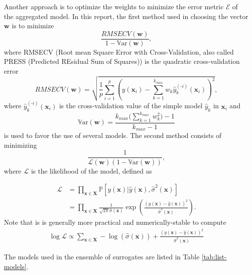\documentclass[12pt]{article}
\def\P{{\mathbb{P}}}
\def\L{{\mathcal{L}}}
\newcommand{\x}{\mathbf{x}}
\newcommand{\w}{\mathbf{w}}
\newcommand{\sh}{\hat{\sigma}}
\newcommand{\yh}{\hat{y}}
\newcommand{\kmax}{{k_{max}}}
\newcommand{\X}{\mathbf{X}}
\newcommand{\var}{\mathbb{V}\text{ar}}
\newcommand{\metric}{\mathcal{E}}
\newcommand{\noti}{^{(\text{-}i)}}
\begin{document}
Another approach is to optimize the weights to minimize the error metric $\metric$ of the aggregated model. In this report, the first method used in choosing the vector $\w$ is to minimize
\begin{displaymath}
\frac{RMSECV(\w)}{1-\var(\w)},
\end{displaymath}
where RMSECV (Root mean Square Error with Cross-Validation, also called PRESS (Predicted REsidual Sum of Squares)) \cite{Allen1974,Tarpey2000} is the quadratic cross-validation error
\begin{equation}
  RMSECV(\w) = \sqrt{ \frac{1}{p} \sum_{i=1}^p \left( y(\x_i)-\sum_{k=1}^\kmax w_k\yh_k\noti(\x_i) \right)^2 },
\end{equation}
where $\yh\noti_k(\x_i)$ is the cross-validation value of the simple model $\yh_k$ in $\x_i$ and 
\begin{equation}
  \var(\w) = \frac{ \kmax\Big(\sum_{k=1}^{\kmax} w_k^2\Big) -1}{\kmax-1}
\end{equation}
is used to favor the use of several models. The second method consists of minimizing
\begin{displaymath}
\frac{1}{\mathcal{L}(\w)(1-\var(\w))},
\end{displaymath}
where $\mathcal{L}$ is the likelihood of the model, defined as


\begin{align}
  \L &= \prod_{\x\in\X} \P[y(\x) | \yh(\x),\sh^2(\x)] \nonumber \\
     &= \prod_{\x\in\X} \frac{1}{\sqrt{2\pi}\sh(\x)}
            \exp \left(
              \frac{(y(\x)-\yh(\x))^2}{\sh^2(\x)}
            \right).
\end{align}
Note that is is generally more practical and numerically-stable to compute
\begin{align}
  \log{\L} \propto \sum_{\x\in\X} -\log(\sh(\x)) + 
              \frac{(y(\x)-\yh(\x))^2}{\sh^2(\x)} \nonumber
\end{align}


The models used in the ensemble of surrogates are listed in Table \ref{tab:list-models}.
\end{document}
